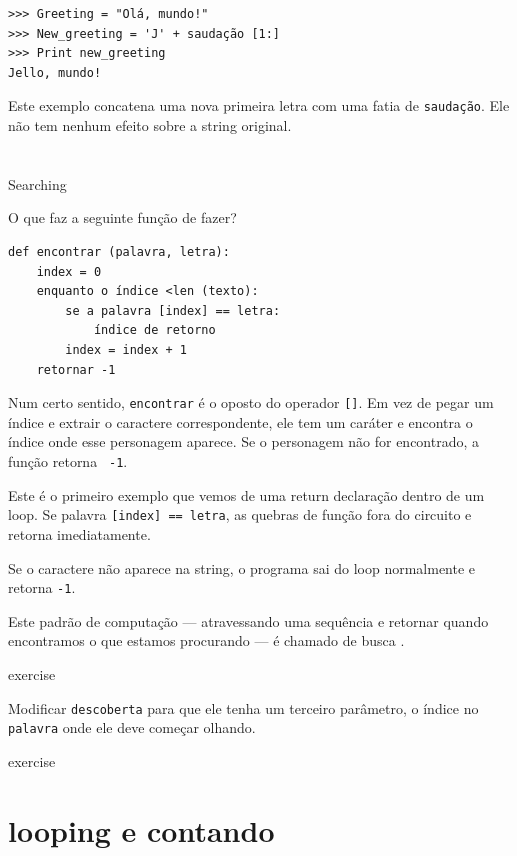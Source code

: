 \documentclass[10pt]{book}
\begin{document}
\begin{exercise}
\begin{verbatim}
>>> Greeting = "Olá, mundo!"
>>> New_greeting = 'J' + saudação [1:]
>>> Print new_greeting
Jello, mundo!
\end{verbatim}
%
Este exemplo concatena uma nova primeira letra com
uma fatia de {\tt saudação}. Ele não tem nenhum efeito sobre
a string original.


\section{} Searching
\label{achado}

O que faz a seguinte função de fazer?

\begin{verbatim}
def encontrar (palavra, letra):
    index = 0
    enquanto o índice <len (texto):
        se a palavra [index] == letra:
            índice de retorno
        index = index + 1
    retornar -1
\end{verbatim}
%
Num certo sentido, {\tt encontrar} é o oposto do operador {\tt []}.
Em vez de pegar um índice e extrair o caractere correspondente,
ele tem um caráter e encontra o índice onde esse personagem
aparece. Se o personagem não for encontrado, a função retorna {\tt
-1}.

Este é o primeiro exemplo que vemos de uma {return \tt} declaração
dentro de um loop. Se {palavra \tt [index] == letra}, as quebras de função
fora do circuito e retorna imediatamente.

Se o caractere não aparece na string, o programa
sai do loop normalmente e retorna {\tt -1}.

Este padrão de computação --- atravessando uma sequência e retornar
quando encontramos o que estamos procurando --- é chamado de busca {\bf}.

\begin{} exercise

Modificar {\tt descoberta} para que ele tenha um
terceiro parâmetro, o índice no {\tt palavra} onde ele deve começar
olhando.

\end{} exercise


\section{looping e contando}
\label{counter}


\end{exercise}
\end{document}
